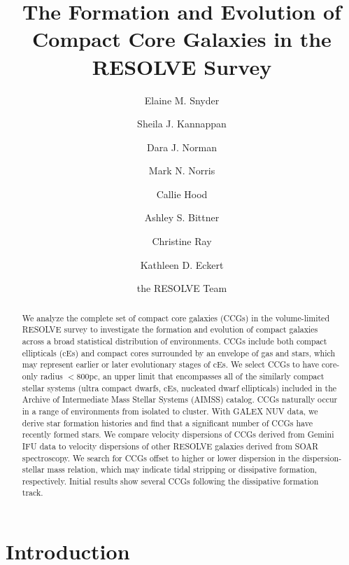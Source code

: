 \documentclass[iop,apj,twocolappendix]{emulateapj}
\begin{document}
\title{The Formation and Evolution of Compact Core Galaxies in the RESOLVE Survey}
\author{Elaine M. Snyder}
\author{Sheila J. Kannappan}
\author{Dara J. Norman}
\author{Mark N. Norris}
\author{Callie Hood}
\author{Ashley S. Bittner}
\author{Christine Ray}
\author{Kathleen D. Eckert}
\author{the RESOLVE Team}
\begin{abstract}
We analyze the complete set of compact core galaxies (CCGs) in the volume-limited RESOLVE survey to investigate the formation and evolution of compact galaxies across a broad statistical distribution of environments. CCGs include both compact ellipticals (cEs) and compact cores surrounded by an envelope of gas and stars, which may represent earlier or later evolutionary stages of cEs. We select CCGs to have core-only radius $<800$pc, an upper limit that encompasses all of the similarly compact stellar systems (ultra compact dwarfs, cEs, nucleated dwarf ellipticals) included in the Archive of Intermediate Mass Stellar Systems (AIMSS) catalog. CCGs naturally occur in a range of environments from isolated to cluster. With GALEX NUV data, we derive star formation histories and find that a significant number of CCGs have recently formed stars. We compare velocity dispersions of CCGs derived from Gemini IFU data to velocity dispersions of other RESOLVE galaxies derived from SOAR spectroscopy. We search for CCGs offset to higher or lower dispersion in the dispersion-stellar mass relation, which may indicate tidal stripping or dissipative formation, respectively. Initial results show several CCGs following the dissipative formation track.
\end{abstract}

\maketitle

\section{Introduction}
\label{intro}
\end{document}
